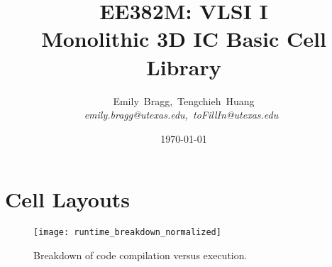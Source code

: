 \documentclass{article}
\title{EE382M: VLSI I \\ Monolithic 3D IC Basic Cell Library}
\author {
	Emily~Bragg,~Tengchieh~Huang\\
       	\em emily.bragg@utexas.edu,~toFillIn@utexas.edu\
}
\date{\today}
\begin{document}
\maketitle


\newpage

\section{}
\paragraph{}




\section{Cell Layouts}

\begin{figure}[h!]
\centering
\texttt{[image: runtime\_breakdown\_normalized]}
\caption{\small Breakdown of code compilation versus execution.}
\end{figure}
\end{document}

